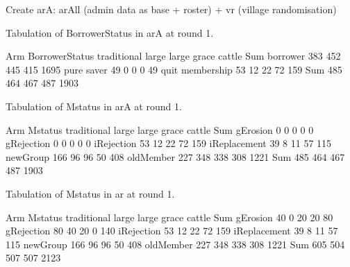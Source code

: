 Create \textsf{arA}: \textsf{arAll} (admin data as base + roster) + \textsf{vr} (village randomisation)

Tabulation of \textsf{BorrowerStatus} in \textsf{arA} at round 1.
\begin{Schunk}
\begin{Soutput}
                 Arm
BorrowerStatus    traditional large large grace cattle  Sum
  borrower                383   452         445    415 1695
  pure saver               49     0           0      0   49
  quit membership          53    12          22     72  159
  Sum                     485   464         467    487 1903
\end{Soutput}
\end{Schunk}
Tabulation of \textsf{Mstatus} in \textsf{arA} at round 1.
\begin{Schunk}
\begin{Soutput}
              Arm
Mstatus        traditional large large grace cattle  Sum
  gErosion               0     0           0      0    0
  gRejection             0     0           0      0    0
  iRejection            53    12          22     72  159
  iReplacement          39     8          11     57  115
  newGroup             166    96          96     50  408
  oldMember            227   348         338    308 1221
  Sum                  485   464         467    487 1903
\end{Soutput}
\end{Schunk}
Tabulation of \textsf{Mstatus} in \textsf{ar} at round 1.
\begin{Schunk}
\begin{Soutput}
              Arm
Mstatus        traditional large large grace cattle  Sum
  gErosion              40     0          20     20   80
  gRejection            80    40          20      0  140
  iRejection            53    12          22     72  159
  iReplacement          39     8          11     57  115
  newGroup             166    96          96     50  408
  oldMember            227   348         338    308 1221
  Sum                  605   504         507    507 2123
\end{Soutput}
\end{Schunk}

